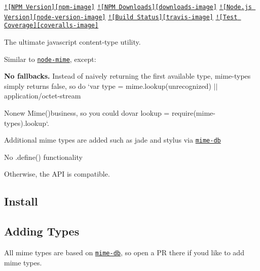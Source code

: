 \href{https://npmjs.org/package/mime-types}{\tt !\mbox{[}N\+P\+M Version\mbox{]}\mbox{[}npm-\/image\mbox{]}} \href{https://npmjs.org/package/mime-types}{\tt !\mbox{[}N\+P\+M Downloads\mbox{]}\mbox{[}downloads-\/image\mbox{]}} \href{http://nodejs.org/download/}{\tt !\mbox{[}Node.\+js Version\mbox{]}\mbox{[}node-\/version-\/image\mbox{]}} \href{https://travis-ci.org/jshttp/mime-types}{\tt !\mbox{[}Build Status\mbox{]}\mbox{[}travis-\/image\mbox{]}} \href{https://coveralls.io/r/jshttp/mime-types}{\tt !\mbox{[}Test Coverage\mbox{]}\mbox{[}coveralls-\/image\mbox{]}}

The ultimate javascript content-\/type utility.

Similar to \href{https://github.com/broofa/node-mime}{\tt node-\/mime}, except\+:


\begin{DoxyItemize}
\item {\bfseries No fallbacks.} Instead of naively returning the first available type, {\ttfamily mime-\/types} simply returns {\ttfamily false}, so do `var type = mime.\+lookup(\textquotesingle{}unrecognized\textquotesingle{}) $\vert$$\vert$ \textquotesingle{}application/octet-\/stream
\item {\ttfamily No}new Mime(){\ttfamily business, so you could do}var lookup = require(\textquotesingle{}mime-\/types\textquotesingle{}).lookup`.
\item Additional mime types are added such as jade and stylus via \href{https://github.com/jshttp/mime-db}{\tt mime-\/db}
\item No {\ttfamily .define()} functionality
\end{DoxyItemize}

Otherwise, the A\+P\+I is compatible.

\subsection*{Install}




\subsection*{Adding Types}

All mime types are based on \href{https://github.com/jshttp/mime-db}{\tt mime-\/db}, so open a P\+R there if you\textquotesingle{}d like to add mime types.

